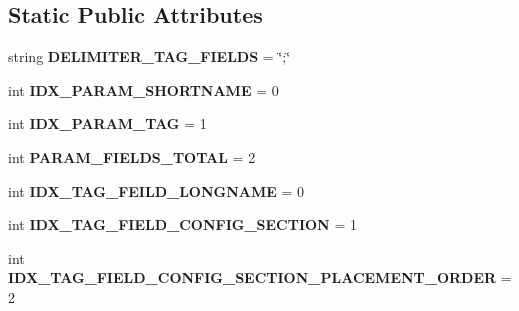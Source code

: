 \subsection*{Static Public Attributes}
\begin{DoxyCompactItemize}
\item 
string {\bfseries D\+E\+L\+I\+M\+I\+T\+E\+R\+\_\+\+T\+A\+G\+\_\+\+F\+I\+E\+L\+DS} = \char`\"{};\char`\"{}\hypertarget{classnegui_1_1pgparamset_1_1PGParamSet_a40e875db5bb216d88fee5fbce8bf229c}{}\label{classnegui_1_1pgparamset_1_1PGParamSet_a40e875db5bb216d88fee5fbce8bf229c}

\item 
int {\bfseries I\+D\+X\+\_\+\+P\+A\+R\+A\+M\+\_\+\+S\+H\+O\+R\+T\+N\+A\+ME} = 0\hypertarget{classnegui_1_1pgparamset_1_1PGParamSet_a5f0fb3e2685ab478b2cc610ddb3cb4ae}{}\label{classnegui_1_1pgparamset_1_1PGParamSet_a5f0fb3e2685ab478b2cc610ddb3cb4ae}

\item 
int {\bfseries I\+D\+X\+\_\+\+P\+A\+R\+A\+M\+\_\+\+T\+AG} = 1\hypertarget{classnegui_1_1pgparamset_1_1PGParamSet_aafe4650bfa58bd9751cdaa173b910c75}{}\label{classnegui_1_1pgparamset_1_1PGParamSet_aafe4650bfa58bd9751cdaa173b910c75}

\item 
int {\bfseries P\+A\+R\+A\+M\+\_\+\+F\+I\+E\+L\+D\+S\+\_\+\+T\+O\+T\+AL} = 2\hypertarget{classnegui_1_1pgparamset_1_1PGParamSet_aeaf803935c95ef6865aa8bc827290cde}{}\label{classnegui_1_1pgparamset_1_1PGParamSet_aeaf803935c95ef6865aa8bc827290cde}

\item 
int {\bfseries I\+D\+X\+\_\+\+T\+A\+G\+\_\+\+F\+E\+I\+L\+D\+\_\+\+L\+O\+N\+G\+N\+A\+ME} = 0\hypertarget{classnegui_1_1pgparamset_1_1PGParamSet_a8df35573197d7171fbb6c900b6dcb057}{}\label{classnegui_1_1pgparamset_1_1PGParamSet_a8df35573197d7171fbb6c900b6dcb057}

\item 
int {\bfseries I\+D\+X\+\_\+\+T\+A\+G\+\_\+\+F\+I\+E\+L\+D\+\_\+\+C\+O\+N\+F\+I\+G\+\_\+\+S\+E\+C\+T\+I\+ON} = 1\hypertarget{classnegui_1_1pgparamset_1_1PGParamSet_ac9ea8e939528fa5975acdfd6c0184d7b}{}\label{classnegui_1_1pgparamset_1_1PGParamSet_ac9ea8e939528fa5975acdfd6c0184d7b}

\item 
int {\bfseries I\+D\+X\+\_\+\+T\+A\+G\+\_\+\+F\+I\+E\+L\+D\+\_\+\+C\+O\+N\+F\+I\+G\+\_\+\+S\+E\+C\+T\+I\+O\+N\+\_\+\+P\+L\+A\+C\+E\+M\+E\+N\+T\+\_\+\+O\+R\+D\+ER} = 2\hypertarget{classnegui_1_1pgparamset_1_1PGParamSet_ace7214b6af0603080aa2d0ea3dea8ea7}{}\label{classnegui_1_1pgparamset_1_1PGParamSet_ace7214b6af0603080aa2d0ea3dea8ea7}


\end{DoxyCompactItemize}
